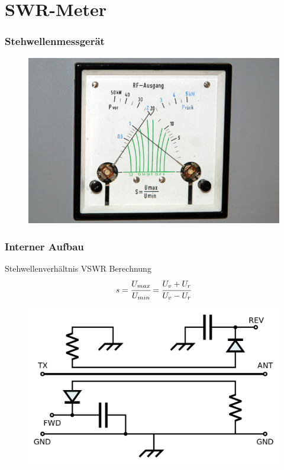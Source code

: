 \section*{SWR-Meter}

\begin{frame}
  \frametitle{Stehwellenmessgerät}
  \begin{center}
    \begin{figure}
      \includegraphics[width=1\textwidth,height=.75\textheight,keepaspectratio]{e17/RS_SWR.jpg}
    \end{figure}
  \end{center}
\end{frame}

\begin{frame}
  \frametitle{Interner Aufbau}
  \begin{block}{Stehwellenverhältnis VSWR Berechnung}
    $$s = \cfrac{U_{max}}{U_{min}} = \cfrac{U_v + U_r}{U_v - U_r}$$
  \end{block}
  \begin{center}
    \begin{figure}
      \includegraphics[width=.8\textwidth,height=.5\textheight,keepaspectratio]{e17/SWRMeterInnen.png}
    \end{figure}
  \end{center}
\end{frame}


